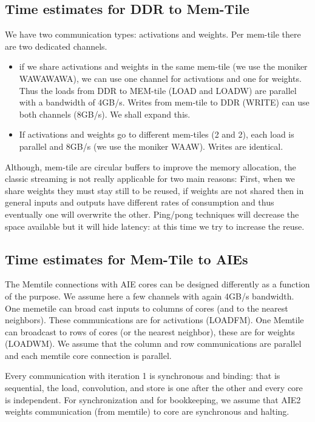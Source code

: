 \documentclass[conference]{IEEEtran}
\begin{document}
\subsection{Time estimates for DDR to Mem-Tile}
We have two communication types: activations and weights. Per
mem-tile there are two dedicated channels.
\begin{itemize}
 \item if we share activations and weights in the same mem-tile (we
   use the moniker WAWAWAWA), we can use one channel for activations
   and one for weights. Thus the loads from DDR to MEM-tile (LOAD and
   LOADW) are parallel with a bandwidth of 4GB/s. Writes from mem-tile
   to DDR (WRITE) can use both channels (8GB/s). We shall expand this.

 \item If activations and weights go to different mem-tiles (2 and 2),
   each load is parallel and 8GB/s (we use the moniker WAAW). Writes
   are identical.
\end{itemize}
Although, mem-tile are circular buffers to improve the memory
allocation, the classic streaming is not really applicable for two
main reasons: First, when we share weights they must stay still to be
reused, if weights are not shared then in general inputs and outputs
have different rates of consumption and thus eventually one will
overwrite the other. Ping/pong techniques will decrease the space
available but it will hide latency: at this time we try to increase
the reuse.
   
\subsection{Time estimates for Mem-Tile to AIEs}

The Memtile connections with AIE cores can be designed differently as
a function of the purpose. We assume here a few channels with again
4GB/s bandwidth. One memetile can broad cast inputs to columns of
cores (and to the nearest neighbors). These communications are for
activations (LOADFM). One Memtile can broadcast to rows of cores (or
the nearest neighbor), these are for weights (LOADWM). We assume that
the column and row communications are parallel and each memtile core
connection is parallel.

Every communication with iteration 1 is synchronous and binding: that
is sequential, the load, convolution, and store is one after the other
and every core is independent.  For synchronization and for
bookkeeping, we assume that AIE2 weights communication (from memtile)
to core are synchronous and halting.
\end{document}
